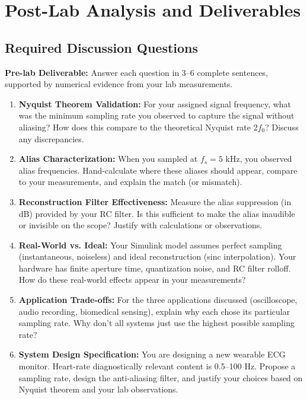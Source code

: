 \documentclass[11pt,letterpaper]{article}
\providecommand{\pldECE}[1]{\textcolor{BrickRed}{\textbf{Pre-lab Deliverable:} #1}}
\begin{document}
\clearpage

\section{Post-Lab Analysis and Deliverables}

\subsection{Required Discussion Questions}

\pldECE{Answer each question in 3--6 complete sentences, supported by numerical evidence from your lab measurements.}

\begin{enumerate}
    \item \textbf{Nyquist Theorem Validation:} For your assigned signal frequency, what was the minimum sampling rate you observed to capture the signal without aliasing? How does this compare to the theoretical Nyquist rate $2 f_0$? Discuss any discrepancies.

    \item \textbf{Alias Characterization:} When you sampled at $f_s = 5$ kHz, you observed alias frequencies. Hand-calculate where these aliases should appear, compare to your measurements, and explain the match (or mismatch).

    \item \textbf{Reconstruction Filter Effectiveness:} Measure the alias suppression (in dB) provided by your RC filter. Is this sufficient to make the alias inaudible or invisible on the scope? Justify with calculations or observations.

    \item \textbf{Real-World vs. Ideal:} Your Simulink model assumes perfect sampling (instantaneous, noiseless) and ideal reconstruction (sinc interpolation). Your hardware has finite aperture time, quantization noise, and RC filter rolloff. How do these real-world effects appear in your measurements?

    \item \textbf{Application Trade-offs:} For the three applications discussed (oscilloscope, audio recording, biomedical sensing), explain why each chose its particular sampling rate. Why don't all systems just use the highest possible sampling rate?

    \item \textbf{System Design Specification:} You are designing a new wearable ECG monitor. Heart-rate diagnostically relevant content is 0.5--100 Hz. Propose a sampling rate, design the anti-aliasing filter, and justify your choices based on Nyquist theorem and your lab observations.
\end{enumerate}
\end{document}
